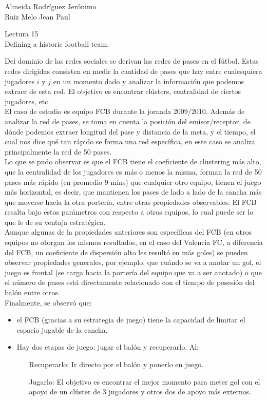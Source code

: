 \documentclass[a4paper, 12pt]{report}
\begin{document}
\begin{flushright}
    Almeida Rodríguez Jerónimo\\
    Ruiz Melo Jean Paul
\end{flushright}

\begin{center}
    {\LARGE Lectura 15}\\
    {\LARGE Defining a historic football team.}
\end{center}

Del dominio de las redes sociales se derivan las redes de pases en el fútbol.
Estas redes dirigidas consisten en medir la cantidad de pases que hay entre
cualesquiera jugadores $i$ y $j$ en un momento dado y analizar la información
que podemos extraer de esta red. El objetivo es encontrar clústers, centralidad
de ciertos jugadores, etc.\\

El caso de estudio es equipo FCB durante la jornada 2009/2010. Además de
analizar la red de pases, se toma en cuenta la posición del emisor/receptor, de
dónde podemos extraer longitud del pase y distancia de la meta, y el tiempo, el
cual nos dice qué tan rápido se forma una red específica, en este caso se
analiza principalmente la red de 50 pases.\\

Lo que se pudo observar es que el FCB tiene el coeficiente de clustering más
alto, que la centralidad de los jugadores es más o menos la misma, forman la
red de 50 pases más rápido (en promedio 9 mins) que cualquier otro equipo,
tienen el juego más horizontal, es decir, que mantienen los pases de lado a lado
de la cancha más que moverse hacia la otra portería, entre otras propiedades
observables. El FCB resalta bajo estos parámetros con respecto a otros equipos,
lo cual puede ser lo que le de su ventaja estratégica.\\

Aunque algunas de la propiedades anteriores son específicas del FCB (en otros
equipos no otorgan los mismos resultados, en el caso del Valencia FC, a
diferencia del FCB, un coeficiente de dispersión alto les resultó en más goles)
se pueden observar propiedades generales, por ejemplo, que cuándo se va a anotar
un gol, el juego es frontal (se carga hacia la portería del equipo que va a ser
anotado) o que el número de pases está directamente relacionado con el tiempo de
posesión del balón entre otros.\\

Finalmente, se observó que:
\begin{itemize}
\item{el FCB (gracias a su estrategia de juego) tiene la capacidad de limitar el
    espacio jugable de la cancha.}
\item{Hay dos etapas de juego: jugar el balón y recuperarlo. Al:
    \begin{itemize}
    \item[Recuperarlo:]{Ir directo por el balón y ponerlo en juego.}
    \item[Jugarlo:]{El objetivo es encontrar el mejor momento para meter gol con
        el apoyo de un clúster de 3 jugadores y otros dos de apoyo más externos.
    }
    \end{itemize}
}
\end{itemize}
\end{document}
